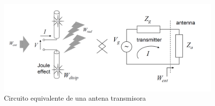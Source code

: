 \begin{figure}[h]
    \centering
        \includegraphics[width=15cm]{archivos/impedancia}
        \caption{Circuito equivalente de una antena transmisora}
        \label{fig:impedancia}
\end{figure}



